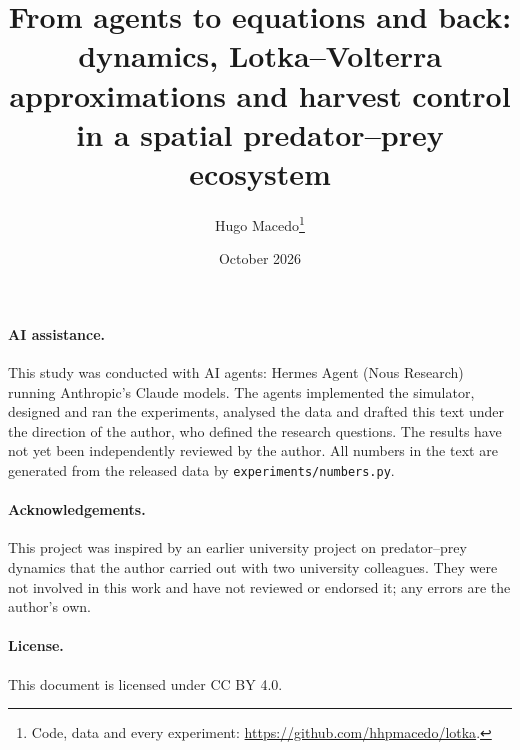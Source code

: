 \documentclass[10pt,a4paper,twocolumn]{article}
\title{\bfseries From agents to equations and back:\\ dynamics, Lotka--Volterra approximations and harvest control\\ in a spatial predator--prey ecosystem}
\author{Hugo Macedo\thanks{Code, data and every experiment: \url{https://github.com/hhpmacedo/lotka}.}}
\date{October 2026}
\begin{document}
\twocolumn[
\maketitle
\begin{abstract}

\end{abstract}
\vspace{1em}]




\paragraph*{AI assistance.} This study was conducted with AI agents: Hermes Agent (Nous Research) running Anthropic's Claude models. The agents implemented the simulator, designed and ran the experiments, analysed the data and drafted this text under the direction of the author, who defined the research questions. The results have not yet been independently reviewed by the author. All numbers in the text are generated from the released data by \texttt{experiments/numbers.py}.

\paragraph*{Acknowledgements.} This project was inspired by an earlier university project on predator--prey dynamics that the author carried out with two university colleagues. They were not involved in this work and have not reviewed or endorsed it; any errors are the author's own.

\paragraph*{License.} This document is licensed under CC BY 4.0.


\end{document}
